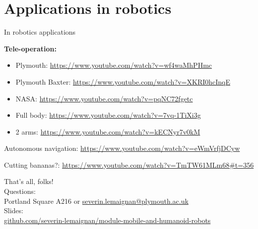\documentclass[compress]{beamer}
\begin{document}
\section{Applications in robotics}

\begin{frame}{In robotics applications}

\textbf{Tele-operation:}

\begin{itemize}

\item
  Plymouth: \url{https://www.youtube.com/watch?v=wf4waMhPHmc}
\item
  Plymouth Baxter: \url{https://www.youtube.com/watch?v=XKRI0hcInqE}
\item
  NASA: \url{https://www.youtube.com/watch?v=pqNC72fgetc}
\item
  Full body: \url{https://www.youtube.com/watch?v=7vq-1TiXi3g}
\item
  2 arms: \url{https://www.youtube.com/watch?v=kECNyr7v0kM}
\end{itemize}

Autonomous navigation: \url{https://www.youtube.com/watch?v=eWmVrfjDCyw}

Cutting bananas?:
\url{https://www.youtube.com/watch?v=TmTW61MLm68\#t=356}

\end{frame}


\begin{frame}{}
    \begin{center}
        \Large
        That's all, folks!\\[2em]
        \normalsize
        Questions:\\
        Portland Square A216 or \url{severin.lemaignan@plymouth.ac.uk} \\[1em]

        Slides:\\ \href{https://github.com/severin-lemaignan/module-mobile-and-humanoid-robots}{\small github.com/severin-lemaignan/module-mobile-and-humanoid-robots}

    \end{center}
\end{frame}
\end{document}
